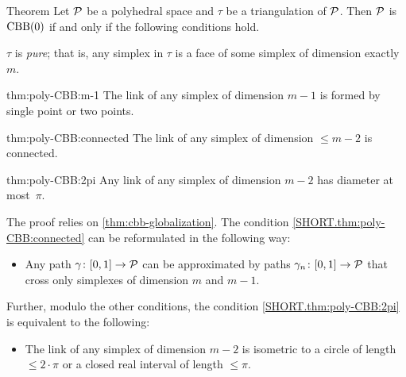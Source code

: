\begin{thm}{Theorem}\label{thm:poly-CBB} Let $\mathcal{P}$ be a polyhedral space and $\tau$ be a triangulation of $\mathcal{P}$.
Then $\mathcal{P}$ is $\mathrm{CBB}(0)$ if and only if the following conditions hold.

\begin{subthm}{} $\tau$ is \emph{pure}; 
that is, any simplex in $\tau$ is  a face of some simplex of dimension exactly $m$. 
\end{subthm}

\begin{subthm}{thm:poly-CBB:m-1}
The link of any simplex of dimension $m-1$ is formed by single point or two points.
\end{subthm}

\begin{subthm}{thm:poly-CBB:connected}
The link of any simplex of dimension $\le m-2$ is connected.
\end{subthm}

\begin{subthm}{thm:poly-CBB:2pi}
Any link of any simplex of dimension $m-2$
has diameter at most~$\pi$.
\end{subthm}
\end{thm}

The proof relies on \ref{thm:cbb-globalization}.
The condition \ref{SHORT.thm:poly-CBB:connected}
can be reformulated in the following way:

\begin{itemize}
 \item[{\it \ref{SHORT.thm:poly-CBB:connected}$'$}] 
Any path $\gamma\colon[0,1]\to \mathcal{P}$ can be approximated by paths
$\gamma_n\colon[0,1]\to \mathcal{P}$ 
that cross only simplexes of dimension $m$ and $m-1$.
\end{itemize}

Further, modulo the other conditions,
the condition \ref{SHORT.thm:poly-CBB:2pi}
is equivalent to the following:


\begin{itemize}
 \item[{\it \ref{SHORT.thm:poly-CBB:2pi}$'$}] 
The link of any simplex of dimension $m-2$ is 
isometric to a circle of length $\le 2\cdot\pi$
or a closed real interval of length $\le \pi$.
\end{itemize}

